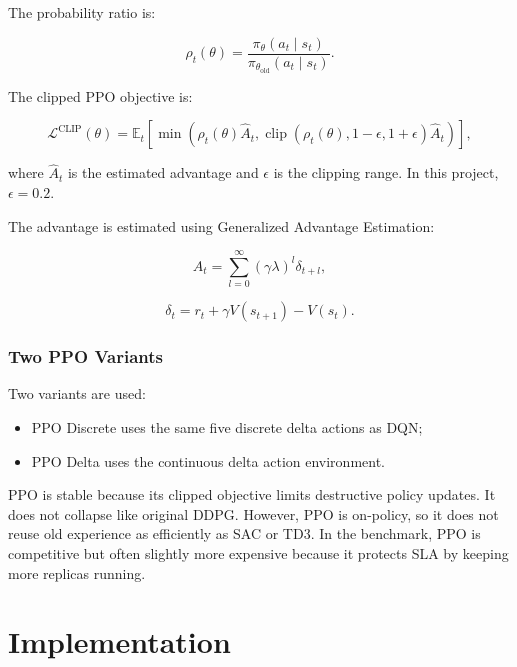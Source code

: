 \documentclass{rapportINPTCLOUD}
\begin{document}
The probability ratio is:

\begin{equation}
\rho_t(\theta)
=
\frac{
\pi_{\theta}(a_t \mid s_t)
}{
\pi_{\theta_{\text{old}}}(a_t \mid s_t)
}.
\end{equation}

The clipped PPO objective is:

\begin{equation}
\mathcal{L}^{\text{CLIP}}(\theta)
=
\mathbb{E}_t
\left[
\min
\left(
\rho_t(\theta)\hat{A}_t,
\operatorname{clip}
(\rho_t(\theta),1-\epsilon,1+\epsilon)\hat{A}_t
\right)
\right],
\end{equation}

where $\hat{A}_t$ is the estimated advantage and $\epsilon$ is the clipping range. In this project, $\epsilon=0.2$.

The advantage is estimated using Generalized Advantage Estimation:

\begin{equation}
\hat{A}_t =
\sum_{l=0}^{\infty}
(\gamma \lambda)^l
\delta_{t+l},
\end{equation}

\begin{equation}
\delta_t =
r_t
+ \gamma V(s_{t+1})
- V(s_t).
\end{equation}

\subsection{Two PPO Variants}

Two variants are used:

\begin{itemize}
  \item PPO Discrete uses the same five discrete delta actions as DQN;
  \item PPO Delta uses the continuous delta action environment.
\end{itemize}

PPO is stable because its clipped objective limits destructive policy updates. It does not collapse like original DDPG. However, PPO is on-policy, so it does not reuse old experience as efficiently as SAC or TD3. In the benchmark, PPO is competitive but often slightly more expensive because it protects SLA by keeping more replicas running.

\chapter{Implementation}
\label{chap:implementation}
\end{document}
